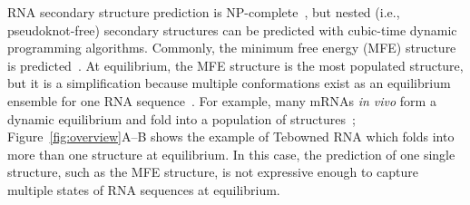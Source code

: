 



RNA secondary structure prediction is NP-complete~\cite{Pedersen+:2000},
but nested (i.e., pseudoknot-free) secondary structures can be predicted with
cubic-time dynamic programming algorithms. 
Commonly, the minimum free energy (MFE) 
structure is predicted~\cite{nussinov+jacobson:1980, zuker+stiegler:1981}.
At equilibrium, the MFE structure is the most populated structure, 
but it 
is a simplification because 
multiple conformations exist 
as an equilibrium ensemble 
for one RNA sequence~\cite{mathews:2004}.
For example, many mRNAs {\textit {in vivo}} form a dynamic equilibrium 
and fold into a population of structures~\cite{Long+:2007, Lu+:2008, Tafer+:2008, lai+:2018}; 
Figure~\ref{fig:overview}A--B shows the example of Tebowned RNA
which folds into more than one structure at equilibrium.
In this case, the prediction of one single structure, such as the MFE structure, 
is not expressive enough to capture multiple states of RNA sequences %
at equilibrium.

